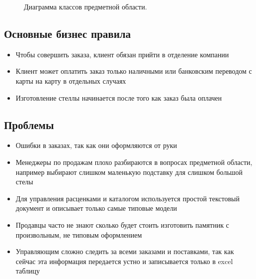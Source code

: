 \documentclass[a4paper,article,14pt]{extarticle}
\begin{document}
\begin{figure}[ht]
\begin{center}
\caption{\label{uml1} Диаграмма классов предметной области.}
\end {center}
\end {figure}

\subsection{Основные бизнес правила}

\begin{itemize}
  \item Чтобы совершить заказа, клиент обязан прийти в отделение компании
  \item Клиент может оплатить заказ только наличными или банковским переводом с карты на карту в отдельных случаях
  \item Изготовление стеллы начинается после того как заказ была оплачен
\end{itemize}

\subsection{Проблемы}
\begin{itemize}
    \item Ошибки в заказах, так как они оформляются от руки
    \item Менеджеры по продажам плохо разбираются в вопросах предметной области, 
    например выбирают слишком маленькую подставку для слишком большой стелы
    \item Для управления расценками и каталогом используется простой текстовый документ и описывает только самые типовые модели
    \item Продавцы часто не знают сколько будет стоить изготовить памятник с произвольным, не типовым оформлением
    \item Управляющим сложно следить за всеми заказами и поставками, 
    так как сейчас эта информация передается устно и записывается только в excel таблицу
\end{itemize}
\end{document}
